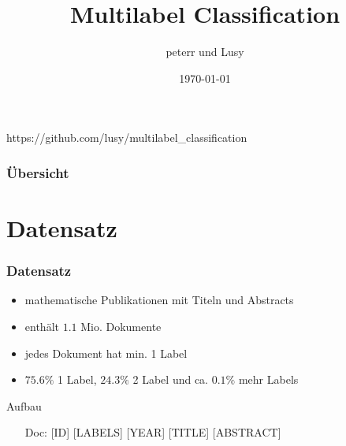 \documentclass[12pt, xcolor=table]{beamer}
\begin{document}
\title{Multilabel Classification}
\author{peterr und Lusy}
\date{\today}

\begin{frame}
    \titlepage
    \begin{block}{https://github.com/lusy/multilabel\_classification}
    \end{block}
\end{frame}

\begin{frame}
    \frametitle{Übersicht}
    \tableofcontents
\end{frame}

\section{Datensatz}
\begin{frame}
    \frametitle{Datensatz}
    \begin{itemize}
        \item mathematische Publikationen mit Titeln und Abstracts
        \item enthält  $1.1$ Mio. Dokumente
        \item jedes Dokument hat min. 1 Label
        \item $75.6 \%$ 1 Label, $24.3 \%$ 2 Label und ca. $0.1 \%$ mehr Labels
    \end{itemize}
    \begin{block}{Aufbau}
        \begin{itemize}
            \item[Doc:] [ID] [LABELS] [YEAR] [TITLE] [ABSTRACT]
        \end{itemize}
    \end{block}
\end{frame}
\end{document}
